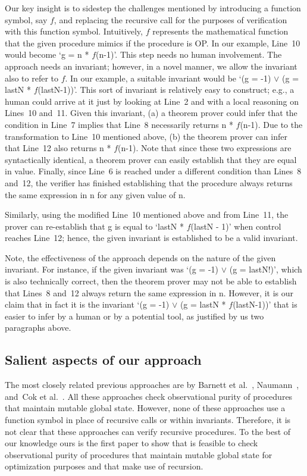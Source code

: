 Our key insight is to sidestep the challenges mentioned by introducing a
function symbol, say $f$, and replacing the recursive call for the purposes
of verification with this function symbol. Intuitively, $f$ represents the
mathematical function that the given procedure mimics if the procedure is
OP.  In our example, Line~10 would become `g = n * $f$(n-1)'. This step
needs no human involvement. The approach needs an invariant; however, in a
novel manner, we allow the invariant also to refer to $f$. In our example,
a suitable invariant would be `(g = -1) $\vee$ (g = lastN *
$f$(lastN-1))'. This sort of invariant is relatively easy to construct;
e.g., a human could arrive at it just by looking at Line~2 and with a local
reasoning on Lines~10 and~11. Given this invariant, (a) a theorem prover
could infer that the condition in Line~7 implies that Line~8 necessarily
returns n * $f$(n-1). Due to the transformation to Line~10 mentioned above,
(b) the theorem prover can infer that Line~12 also returns n *
$f$(n-1). Note that since these two expressions are syntactically
identical, a theorem prover can easily establish that they are equal in
value.  Finally, since Line~6 is reached under a different condition than
Lines~8 and~12, the verifier has finished establishing that the procedure
always returns the same expression in n for any given value of n.

Similarly, using the modified Line~10 mentioned above and from Line~11, the
prover can re-establish that g is equal to `lastN * $f$(lastN - 1)' when
control reaches Line~12; hence, the given invariant is established to be a
valid invariant.

Note, the effectiveness of the approach depends on the nature of the given
invariant. For instance, if the given invariant was `(g = -1) $\vee$ (g =
lastN!)', which is also technically correct, then the theorem prover may
not be able to establish that Lines~8 and~12 always return the same
expression in n. However, it is our claim that in fact it is the invariant
`(g = -1) $\vee$ (g = lastN * $f$(lastN-1))' that is easier to infer by a
human or by a potential tool, as justified by us two paragraphs above.

\subsection{Salient aspects of our approach}


The most closely related previous approaches are by Barnett et
al.~\cite{barnett200499,barnett2006allowing},
Naumann~\cite{naumann2007observational}, and~Cok et
al.~\cite{cok2008extensions}.  All these approaches check observational
purity of procedures that maintain mutable global state. However, none of
these approaches use a function symbol in place of recursive calls or
within invariants. Therefore, it is not clear that these approaches can
verify recursive procedures. To
the best of our knowledge ours is the first paper to show that is
feasible to check observational purity of procedures that maintain mutable
global state for optimization purposes and that make use of recursion.

